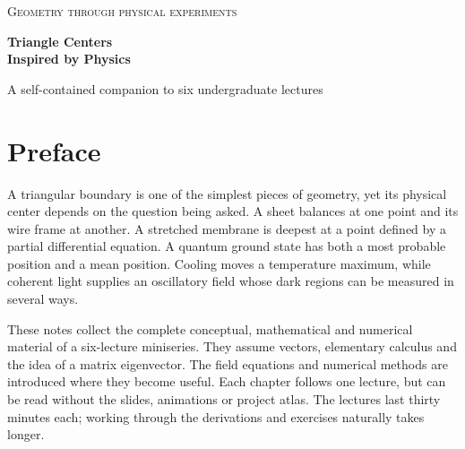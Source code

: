 \documentclass[11pt,oneside,openany]{book}
\begin{document}
\frontmatter


\begin{titlepage}\centering\vspace*{14mm}
{\small\scshape Geometry through physical experiments\par}\vspace{12mm}
{\Huge\bfseries\color{navy} Triangle Centers\\[3mm] Inspired by Physics\par}
\vspace{8mm}{\LARGE Lecture Notes\par}\vspace{12mm}
\vfill{\large A self-contained companion to six undergraduate lectures\par}
\vspace{5mm}{\small Balance and geometry $\cdot$ charges and currents\\
Membranes and fluids $\cdot$ quantum and random motion\\
Heat and reaction $\cdot$ optics\par}
\vspace{10mm}{\small First teaching edition\\1 October 2026\par}
\end{titlepage}
\chapter*{Preface}
A triangular boundary is one of the simplest pieces of geometry, yet its
physical center depends on the question being asked. A sheet balances at
one point and its wire frame at another. A stretched membrane is deepest
at a point defined by a partial differential equation. A quantum ground
state has both a most probable position and a mean position. Cooling moves
a temperature maximum, while coherent light supplies an oscillatory field
whose dark regions can be measured in several ways.

These notes collect the complete conceptual, mathematical and numerical
material of a six-lecture miniseries. They assume vectors, elementary
calculus and the idea of a matrix eigenvector. The field equations and
numerical methods are introduced where they become useful. Each chapter
follows one lecture, but can be read without the slides, animations or
project atlas. The lectures last thirty minutes each; working through the
derivations and exercises naturally takes longer.
\end{document}
